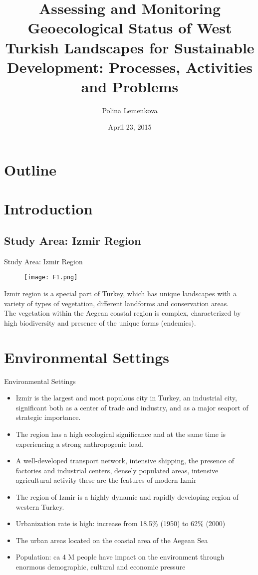 \documentclass[pdflatex,compress,9pt,
	xcolor={dvipsnames,dvipsnames,svgnames,x11names,table},
	hyperref={colorlinks = true,breaklinks = true, urlcolor = NavyBlue, breaklinks = true}]{beamer}
\title{Assessing and Monitoring Geoecological Status of West Turkish Landscapes for Sustainable Development: Processes, Activities and Problems}
\author{Polina Lemenkova}
\date{April 23, 2015}
\begin{document}
\begin{frame}
           \titlepage
\end{frame}

\section*{Outline}
\begin{frame}
	\scriptsize \tableofcontents
\end{frame}

\section{Introduction}
\subsection{Study Area: Izmir Region}
\begin{frame}{Study Area: Izmir Region}
\begin{figure}[H]
	\centering
		\texttt{[image: F1.png]}
\end{figure}
Izmir region is a special part of Turkey, which has unique landscapes with a variety of types of vegetation, different landforms and conservation areas.\\
The vegetation within the Aegean coastal region is complex, characterized by high biodiversity and presence of the unique forms (endemics).	
\end{frame}

\section{Environmental Settings}
\begin{frame}{Environmental Settings}
\begin{itemize}
            \item Izmir is the  largest and most populous city in Turkey, an industrial city, significant both as a center of trade and industry, and as a major seaport of strategic importance.
            \item The region has a high ecological significance and at the same time is experiencing a strong anthropogenic load.
            \item A well-developed transport network, intensive shipping, the presence of factories and industrial centers, densely populated areas, intensive agricultural activity-these are the features of modern Izmir
            \item The region of Izmir is a highly dynamic and rapidly developing region of western Turkey.
            \item Urbanization rate is high: increase from 18.5\% (1950) to 62\% (2000)
            \item The urban areas located on the coastal area of the Aegean Sea
            \item Population: ca 4 M people have impact on the environment through enormous demographic, cultural and economic pressure
 \end{itemize}
\end{frame}
\end{document}
